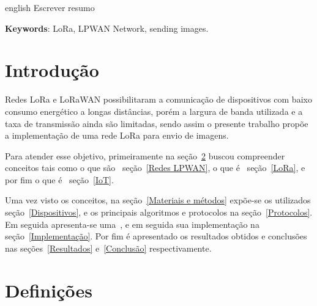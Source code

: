 \documentclass[
article,			%
12pt,				%
oneside,			%
a4paper,			%
english,			%
brazil,				%
sumario=tradicional
]{abntex2}
\begin{document}
\renewcommand{\resumoname}{Abstract}
\begin{resumoumacoluna}
  \begin{otherlanguage*}{english}
    Escrever resumo
    \vspace{\onelineskip}
    \noindent

    \textbf{Keywords}: LoRa, LPWAN Network, sending images.
  \end{otherlanguage*}  
\end{resumoumacoluna}



\cleardoublepage



\textual

\section{Introdução}\label{Introdução}
Redes LoRa e LoRaWAN possibilitaram a comunicação de dispositivos com baixo consumo energético a longas distâncias\cite{bor2016lora}, porém a largura de banda utilizada e a taxa de transmissão ainda são limitadas, sendo assim o presente trabalho propõe a implementação de uma rede LoRa para envio de imagens.

Para atender esse objetivo, primeiramente na seção~\ref{Definições} buscou compreender conceitos tais como o que são~ seção~\ref{Redes LPWAN}, o que é~ seção~\ref{LoRa}, e por fim o que é~ seção~\ref{IoT}.

Uma vez visto os conceitos, na seção~\ref{Materiais e métodos} expõe-se os  utilizados seção~\ref{Dispositivos}, e os principais algoritmos e protocolos na seção~\ref{Protocolos}. Em seguida apresenta-se uma~, e em seguida sua implementação na seção~\ref{Implementação}. Por fim é apresentado os resultados obtidos e conclusões nas seções~\ref{Resultados} e~\ref{Conclusão} respectivamente.

\section{Definições}\label{Definições}
\end{document}
